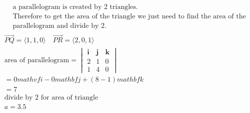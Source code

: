 \documentclass{article}
\newcommand{\ezmatrix}[6]{
    \begin{vmatrix}
        \mathbf{i} & \mathbf{j} & \mathbf{k} \\
        #1 & #2 & #3 \\
        #4 & #5 & #6
    \end{vmatrix}
}
\newcommand{\vecgen}[3]{\langle #1, #2, #3 \rangle} %
\begin{document}
\begin{align*}
    \begin{aligned}
    &\text{a parallelogram is created by 2 triangles.} \\
    &\text{Therefore  to get the area of the triangle we just need to find the area of the}\\
    &\text{parallelogram and divide by 2.}
    \end{aligned}\\
    \vec{PQ} = \vecgen{1}{1}{0} \quad
    \vec{PR} = \vecgen{2}{0}{1} \\
    \text{area of parallelogram} = \ezmatrix{2}{1}{0}{1}{4}{0} \\
    = 0mathvf{i} - 0mathbf{j} + (8-1)mathbf{k} \\
    = 7 \\
    \text{divide by 2 for area of triangle}\\
    a = 3.5
\end{align*}
\end{document}

